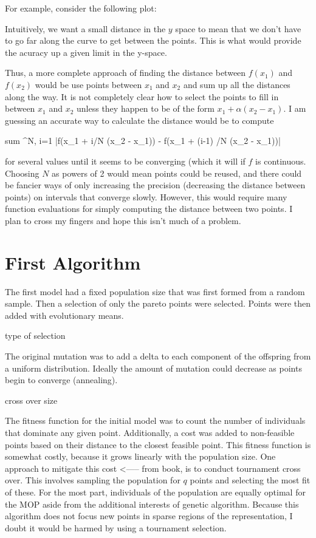 \documentclass{article}
\begin{document}
{{For example, consider the following plot:


Intuitively, we want a small distance in the $y$ space to mean that we don't have to go far along the curve to get between the points.
This is what would provide the acuracy up a given limit in the y-space.

Thus, a more complete approach of finding the distance between $f(x_1)$ and $f(x_2)$ would be use points between $x_1$ and $x_2$ and sum up all the distances along the way.
It is not completely clear how to select the points to fill in between $x_1$ and $x_2$ unless they happen to be of the form $x_1 + \alpha (x_2 - x_1)$.
I am guessing an accurate way to calculate the distance would be to compute 

sum ^N, i=1   |f(x_1 + i/N (x_2 - x_1)) - f(x_1 + (i-1) /N (x_2 - x_1))| 

for several values until it seems to be converging (which it will if $f$ is continuous.
Choosing $N$ as powers of 2 would mean points could be reused, and there could be fancier ways of only increasing the precision (decreasing the distance between points) on intervals that
converge slowly.
However, this would require many function evaluations for simply computing the distance between two points.
I plan to cross my fingers and hope this isn't much of a problem.


\section{First Algorithm}

The first model had a fixed population size that was first formed from a random sample.
Then a selection of only the pareto points were selected.
Points were then added with evolutionary means.

type of selection

The original mutation was to add a delta to each component of the offspring from a uniform distribution.
Ideally the amount of mutation could decrease as points begin to converge (annealing).


cross over size

The fitness function for the initial model was to count the number of individuals that dominate any given point.
Additionally, a cost was added to non-feasible points based on their distance to the closest feasible point.
This fitness function is somewhat costly, because it grows linearly with the population size.
One approach to mitigate this cost <----- from book, is to conduct tournament cross over.
This involves sampling the population for $q$ points and selecting the most fit of these.
For the most part, individuals of the population are equally optimal for the MOP aside from the additional interests of genetic algorithm.
Because this algorithm does not focus new points in sparse regions of the representation, I doubt it would be harmed by using a tournament selection.

}}
\end{document}

